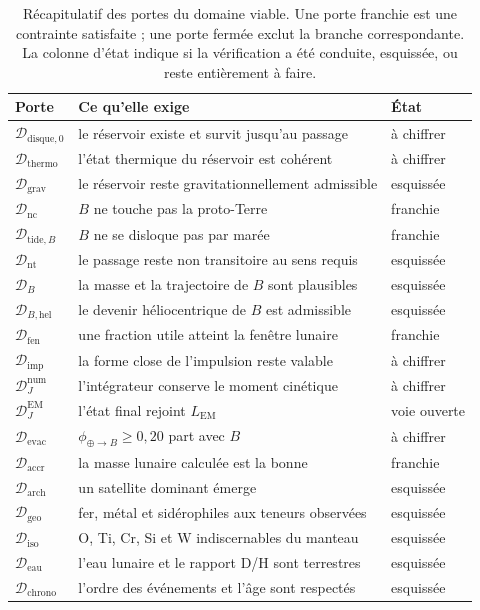 \documentclass[11pt,a4paper,openany]{report}
\begin{document}
\begin{table}[htbp]
\centering
\small
\caption{Récapitulatif des portes du domaine viable. Une porte franchie est une contrainte
satisfaite ; une porte fermée exclut la branche correspondante. La colonne d'état indique si la
vérification a été conduite, esquissée, ou reste entièrement à faire.}
\label{tab:portes}
\begin{tabularx}{\textwidth}{>{\raggedright\arraybackslash}p{2.6cm}
>{\raggedright\arraybackslash}X >{\raggedright\arraybackslash}p{2.6cm}}
\toprule
\textbf{Porte} & \textbf{Ce qu'elle exige} & \textbf{État} \\
\midrule
$\mathcal{D}_{\mathrm{disque},0}$ & le réservoir existe et survit jusqu'au passage & à chiffrer \\
$\mathcal{D}_{\mathrm{thermo}}$ & l'état thermique du réservoir est cohérent & à chiffrer \\
$\mathcal{D}_{\mathrm{grav}}$ & le réservoir reste gravitationnellement admissible & esquissée \\
\midrule
$\mathcal{D}_{\mathrm{nc}}$ & $B$ ne touche pas la proto-Terre & franchie \\
$\mathcal{D}_{\mathrm{tide},B}$ & $B$ ne se disloque pas par marée & franchie \\
$\mathcal{D}_{\mathrm{nt}}$ & le passage reste non transitoire au sens requis & esquissée \\
$\mathcal{D}_{B}$ & la masse et la trajectoire de $B$ sont plausibles & esquissée \\
$\mathcal{D}_{B,\mathrm{hel}}$ & le devenir héliocentrique de $B$ est admissible & esquissée \\
\midrule
$\mathcal{D}_{\mathrm{fen}}$ & une fraction utile atteint la fenêtre lunaire & franchie \\
$\mathcal{D}_{\mathrm{imp}}$ & la forme close de l'impulsion reste valable & à chiffrer \\
$\mathcal{D}_{J}^{\mathrm{num}}$ & l'intégrateur conserve le moment cinétique & à chiffrer \\
$\mathcal{D}_{J}^{\mathrm{EM}}$ & l'état final rejoint $L_{\mathrm{EM}}$ & voie ouverte \\
$\mathcal{D}_{\mathrm{evac}}$ & $\phi_{\oplus\to B}\ge0{,}20$ part avec $B$ & à chiffrer \\
\midrule
$\mathcal{D}_{\mathrm{accr}}$ & la masse lunaire calculée est la bonne & franchie \\
$\mathcal{D}_{\mathrm{arch}}$ & un satellite dominant émerge & esquissée \\
$\mathcal{D}_{\mathrm{geo}}$ & fer, métal et sidérophiles aux teneurs observées & esquissée \\
$\mathcal{D}_{\mathrm{iso}}$ & O, Ti, Cr, Si et W indiscernables du manteau & esquissée \\
$\mathcal{D}_{\mathrm{eau}}$ & l'eau lunaire et le rapport D/H sont terrestres & esquissée \\
$\mathcal{D}_{\mathrm{chrono}}$ & l'ordre des événements et l'âge sont respectés & esquissée \\
\bottomrule
\end{tabularx}
\end{table}
\end{document}
